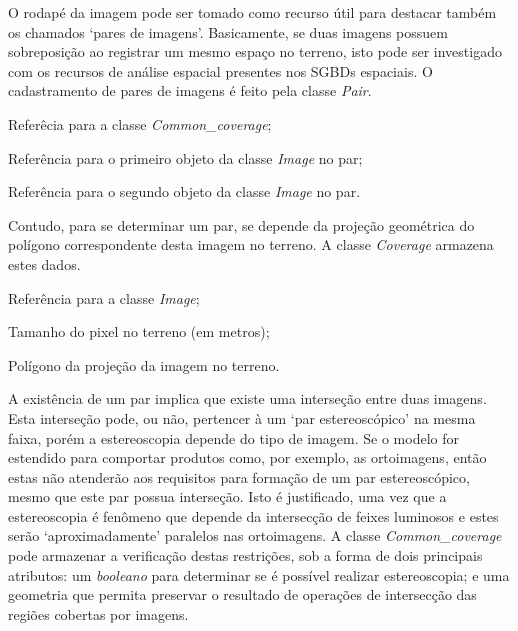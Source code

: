 O rodapé da imagem pode ser tomado como recurso útil para destacar também os chamados `pares de imagens'. Basicamente, se duas imagens possuem sobreposição ao registrar um mesmo espaço no terreno, isto pode ser investigado com os recursos de análise espacial presentes nos SGBDs espaciais. O cadastramento de pares de imagens é feito pela classe \textit{Pair}. 

\begin{description}[labelwidth=2cm, itemsep=-0.3cm]
\item [Classe Pair]
\item[Id\_c\_cov:]  Referêcia para a classe \textit{Common\_coverage};
\item[Id\_img1]  Referência para o primeiro objeto da classe \textit{Image} no par;
\item[Id\_img2]  Referência para o segundo objeto da classe \textit{Image} no par.
\end{description}

Contudo, para se determinar um par, se depende da projeção geométrica do polígono correspondente desta imagem no terreno. A classe \textit{Coverage} armazena estes dados.

\begin{description}[labelwidth=2cm, itemsep=-0.3cm]
\item [Classe Coverage]
\item[Id\_img]  Referência para a classe \textit{Image};
\item[Gsd:] Tamanho do pixel no terreno (em metros);
\item[Geom:] Polígono da projeção da imagem no terreno.
\end{description}

A existência de um par implica que existe uma interseção entre duas imagens. Esta interseção pode, ou não, pertencer à um `par estereoscópico' na mesma faixa, porém a estereoscopia depende do tipo de imagem. Se o modelo for estendido para comportar produtos como, por exemplo, as ortoimagens, então estas não atenderão aos requisitos para formação de um par estereoscópico, mesmo que este par possua interseção. Isto é justificado, uma vez que a estereoscopia é fenômeno que depende da intersecção de feixes luminosos  e estes serão `aproximadamente' paralelos nas ortoimagens. A classe \textit{Common\_coverage} pode armazenar a verificação destas restrições, sob a forma de dois principais atributos: um \textit{booleano} para determinar se é possível realizar estereoscopia; e uma geometria que permita preservar o resultado de operações de intersecção das regiões cobertas por imagens.

